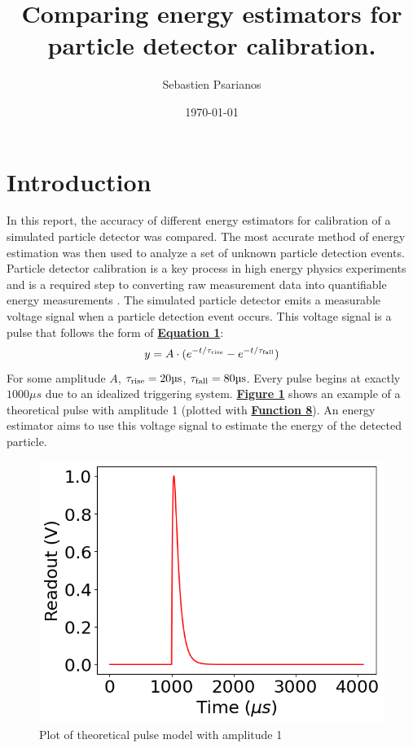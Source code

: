 \documentclass[
	letterpaper, %
	10pt, %
]{template}
\title{Comparing energy estimators for particle detector calibration.}
\author{Sebastien Psarianos}
\date{\today}
\begin{document}
\renewcommand{\lstlistingname}{Function}

\maketitle

\section{Introduction}
In this report, the accuracy of different energy estimators for calibration of a simulated particle detector was compared. The most accurate method of energy estimation was then used to analyze a set of unknown particle detection events. Particle detector calibration is a key process in high energy physics experiments and is a required step to converting raw measurement data into quantifiable energy measurements \cite{Hanagaki2022}. The simulated particle detector emits a measurable voltage signal when a particle detection event occurs. This voltage signal is a pulse that follows the form of \textbf{\hyperref[eqn-1]{Equation 1}}:
\begin{equation}
	\label{eqn-1}
	y = A \cdot(e^{-t/\tau_{\rm rise}} - e^{-t/\tau_{\rm fall}})
\end{equation}
For some amplitude $A$, $\tau_{\rm rise}= 20\unit{\micro s}$, $\tau_{\rm fall} =80\unit{\micro s}$. Every pulse begins at exactly $1000\unit{\mu s}$ due to an idealized triggering system. \cite{labManual} \textbf{\hyperref[fig::pulseSim]{Figure 1}} shows an example of a theoretical pulse with amplitude 1 (plotted with \textbf{\hyperref[lst-8]{Function 8}}). An energy estimator aims to use this voltage signal to estimate the energy of the detected particle.
\begin{figure}[H]
	\centering
	\includegraphics[width=.6\textwidth]{figures/pulses_sim.png}
	\caption{Plot of theoretical pulse model with amplitude 1~\label{fig::pulseSim}}
\end{figure}
\end{document}

